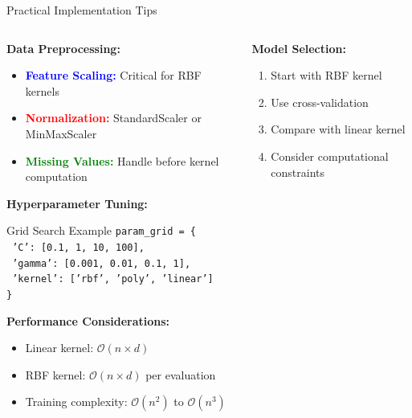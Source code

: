 \documentclass[8pt,aspectratio=1610]{beamer}
\begin{document}
\begin{frame}{Practical Implementation Tips}
\begin{columns}[t]
\begin{column}{0.48\textwidth}
\textbf{Data Preprocessing:}
\vspace{0.2cm}

\begin{itemize}
\setlength{\itemsep}{1pt}
\item \textcolor{blue}{\textbf{Feature Scaling:}} Critical for RBF kernels
\item \textcolor{red}{\textbf{Normalization:}} StandardScaler or MinMaxScaler
\item \textcolor{green}{\textbf{Missing Values:}} Handle before kernel computation
\end{itemize}

\vspace{0.3cm}
\textbf{Hyperparameter Tuning:}
\vspace{0.2cm}

\begin{block}{Grid Search Example}
\scriptsize
\texttt{param\_grid = \{} \\
\texttt{    'C': [0.1, 1, 10, 100],} \\
\texttt{    'gamma': [0.001, 0.01, 0.1, 1],} \\
\texttt{    'kernel': ['rbf', 'poly', 'linear']} \\
\texttt{\}}
\end{block}

\vspace{0.3cm}
\textbf{Performance Considerations:}
\begin{itemize}
\setlength{\itemsep}{1pt}
\item Linear kernel: $\mathcal{O}(n \times d)$
\item RBF kernel: $\mathcal{O}(n \times d)$ per evaluation
\item Training complexity: $\mathcal{O}(n^2)$ to $\mathcal{O}(n^3)$
\end{itemize}
\end{column}

\begin{column}{0.48\textwidth}
\textbf{Model Selection:}
\vspace{0.2cm}

\begin{enumerate}
\setlength{\itemsep}{1pt}
\item Start with RBF kernel
\item Use cross-validation
\item Compare with linear kernel
\item Consider computational constraints
\end{enumerate}


\end{column}
\end{columns}
\end{frame}
\end{document}
